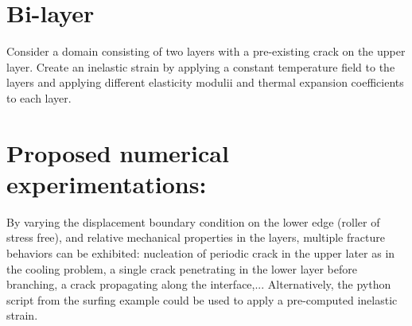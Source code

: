 \documentclass[10pt,oneside]{memoir}
\begin{document}
\section{Bi-layer}
Consider a domain consisting of two layers with a pre-existing crack on the upper layer. Create an inelastic strain by applying a constant temperature field to the layers and applying different elasticity modulii and thermal expansion coefficients to each layer.

\section*{Proposed numerical experimentations:}
By varying the displacement boundary condition on the lower edge (roller of stress free), and relative mechanical properties in the layers, multiple fracture behaviors can be exhibited: nucleation of periodic crack in the upper later as in the cooling problem, a single crack penetrating in the lower layer before branching, a crack propagating along the interface,...
Alternatively, the python script from the surfing example could be used to apply a pre-computed inelastic strain.



\end{document}
